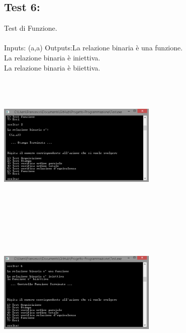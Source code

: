 \documentclass[11pt, a4paper, titlepage, block]{article}
\begin{document}
	\subsection{Test 6:}
	Test di Funzione.\\
	\\
	Inputs: (a,a) 
	Outputs:La relazione binaria \`e  una funzione.\\
	La relazione binaria \`e  iniettiva.\\
	La relazione binaria \`e  biiettiva.\\
	\includegraphics[width=3in,height=3in,viewport=0 0 300 300]{../Screenshots/Test6Input.png}
	\\
	\includegraphics[width=3in,height=3in,viewport=0 0 300 300]{../Screenshots/Test6Output.png}
	\\
	\\
	\newpage
\end{document}
